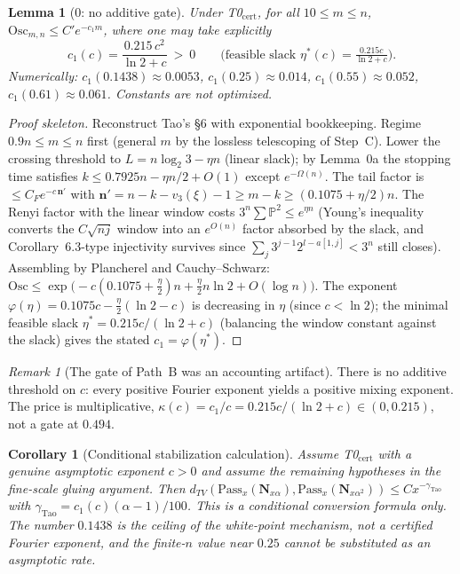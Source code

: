 \documentclass[12pt,a4paper]{article}
\newtheorem{lemma}[theorem]{Lemma}
\newtheorem{corollary}[theorem]{Corollary}
\theoremstyle{remark}
\newtheorem{remark}[theorem]{Remark}
\begin{document}
\begin{lemma}[0: no additive gate]
Under T0$_{\mathrm{cert}}$, for all $10\le m\le n$,
$\mathrm{Osc}_{m,n}\le C'e^{-c_1m}$, where one may take explicitly
\[
c_1(c)=\frac{0.215\,c^2}{\ln2+c}\ >\ 0
\qquad\big(\text{feasible slack }\eta^*(c)=\tfrac{0.215c}{\ln2+c}\big).
\]
Numerically: $c_1(0.1438)\approx0.0053$, $c_1(0.25)\approx0.014$,
$c_1(0.55)\approx0.052$, $c_1(0.61)\approx0.061$. Constants are not optimized.
\end{lemma}
\begin{proof}[Proof skeleton]
Reconstruct Tao's \S6 with exponential bookkeeping. Regime $0.9n\le m\le n$
first (general $m$ by the lossless telescoping of Step~C). Lower the crossing
threshold to $L=n\log_2 3-\eta n$ (linear slack); by Lemma~0a the stopping time
satisfies $k\le0.7925n-\eta n/2+O(1)$ except $e^{-\Omega(n)}$. The tail factor
is $\le C_Fe^{-c\,\mathbf n'}$ with
$\mathbf n'=n-k-v_3(\xi)-1\ge m-k\ge(0.1075+\eta/2)n$. The Renyi factor with
the linear window costs $3^n\sum\mathbb P^2\le e^{\eta n}$ (Young's inequality
converts the $C\sqrt{nj}$ window into an $e^{O(n)}$ factor absorbed by the
slack, and Corollary~6.3-type injectivity survives since
$\sum_j3^{j-1}2^{l-a[1,j]}<3^n$ still closes). Assembling by Plancherel and
Cauchy--Schwarz:
$\mathrm{Osc}\le\exp\big(-c(0.1075+\tfrac\eta2)n+\tfrac\eta2n\ln2+O(\log n)\big)$.
The exponent $\varphi(\eta)=0.1075c-\tfrac\eta2(\ln2-c)$ is decreasing in
$\eta$ (since $c<\ln2$); the minimal feasible slack
$\eta^*=0.215c/(\ln2+c)$ (balancing the window constant against the slack)
gives the stated $c_1=\varphi(\eta^*)$.
\end{proof}
\begin{remark}[The gate of Path~B was an accounting artifact]
There is no additive threshold on $c$: every positive Fourier exponent yields
a positive mixing exponent. The price is multiplicative,
$\kappa(c)=c_1/c=0.215c/(\ln2+c)\in(0,0.215)$, not a gate at $0.494$.
\end{remark}
\begin{corollary}[Conditional stabilization calculation]
Assume T0$_{\mathrm{cert}}$ with a genuine asymptotic exponent $c>0$ and assume
the remaining hypotheses in the fine-scale gluing argument.  Then
$d_{TV}(\mathrm{Pass}_x(\mathbf N_{x\alpha}),\mathrm{Pass}_x(\mathbf N_{x\alpha^2}))
\le Cx^{-\gamma_{\mathrm{Tao}}}$ with
$\gamma_{\mathrm{Tao}}=c_1(c)(\alpha-1)/100$.  This is a conditional conversion
formula only.  The number $0.1438$ is the ceiling of the white-point mechanism,
not a certified Fourier exponent, and the finite-$n$ value near $0.25$ cannot
be substituted as an asymptotic rate.
\end{corollary}
\end{document}

